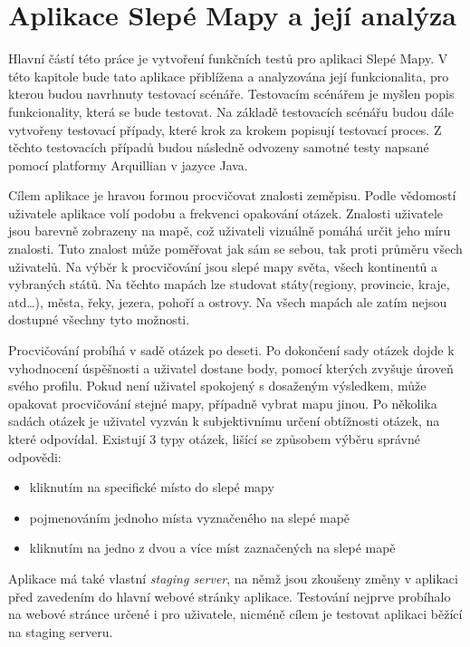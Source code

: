 \documentclass[
    color,   %
	table,   %
    twoside, %
    nolot, nolof
]{fithesis3}
\begin{document}
\chapter{Aplikace Slepé Mapy a její analýza}
\label{ch:chapter4}
Hlavní částí této práce je vytvoření funkčních testů pro aplikaci Slepé Mapy. V této kapitole bude tato aplikace přiblížena a analyzována její funkcionalita, pro kterou  budou navrhnuty testovací scénáře. Testovacím scénářem je myšlen popis funkcionality, která se bude testovat. Na základě testovacích scénářu budou dále vytvořeny testovací případy, které krok za krokem popisují testovací proces. Z těchto testovacích případů budou následně odvozeny samotné testy napsané pomocí platformy Arquillian v jazyce Java.

Cílem aplikace je hravou formou procvičovat znalosti zeměpisu. Podle vědomostí uživatele aplikace volí podobu a frekvenci opakování otázek. Znalosti uživatele jsou barevně zobrazeny na mapě, což uživateli vizuálně pomáhá určit jeho míru znalosti. Tuto znalost může poměřovat jak sám se sebou, tak proti průměru všech uživatelů. Na výběr k procvičování jsou slepé mapy světa, všech kontinentů a vybraných států. Na těchto mapách lze studovat státy(regiony, provincie, kraje, atd\ldots), města, řeky, jezera, pohoří a ostrovy. Na všech mapách ale zatím nejsou dostupné všechny tyto možnosti.

Procvičování probíhá v sadě otázek po deseti. Po dokončení sady otázek dojde k vyhodnocení úspěšnosti a uživatel dostane body, pomocí kterých zvyšuje úroveň svého profilu. Pokud není uživatel spokojený s dosaženým výsledkem, může opakovat procvičování stejné mapy, případně vybrat mapu jinou. Po několika sadách otázek je uživatel vyzván k subjektivnímu určení obtížnosti otázek, na které odpovídal. Existují 3 typy otázek, lišící se způsobem výběru správné odpovědi:

\begin{itemize}
\item kliknutím na specifické místo do slepé mapy
\item pojmenováním jednoho místa vyznačeného na slepé mapě
\item kliknutím na jedno z dvou a více míst zaznačených na slepé mapě
\end{itemize}

Aplikace má také vlastní \emph{staging server}, na němž jsou zkoušeny změny v aplikaci před zavedením do hlavní webové stránky aplikace. Testování nejprve probíhalo na webové stránce určené i pro uživatele, nicméně cílem je testovat aplikaci běžící na staging serveru.
\end{document}
